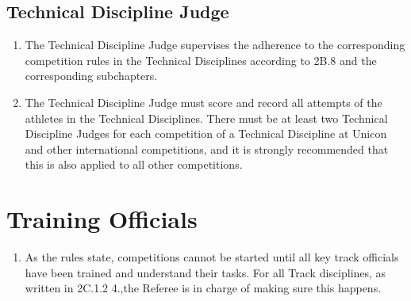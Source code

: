 \subsection{Technical Discipline Judge}

\begin{enumerate}[leftmargin=1.5em,labelsep=*]
	\item The Technical Discipline Judge supervises the adherence to the corresponding competition rules in the 
    Technical Disciplines according to 2B.8 and the corresponding subchapters.
	
	\item The Technical Discipline Judge must score and record all attempts of the athletes in the 
    Technical Disciplines. There must be at least two Technical Discipline Judges for each competition of a 
    Technical Discipline at Unicon and other international competitions, and it is strongly recommended 
    that this is also applied to all other competitions.
\end{enumerate}

\section{Training Officials}

\begin{enumerate}[leftmargin=1.5em,labelsep=*]
    \item As the rules state, competitions cannot be started until all key track officials have been 
    trained and understand their tasks.
    For all Track disciplines, as written in 2C.1.2 4.,the Referee is in charge of making sure this happens.
\end{enumerate}
